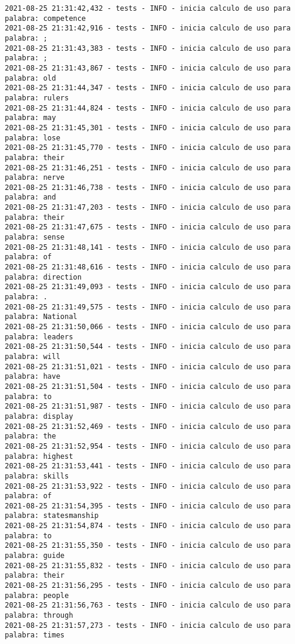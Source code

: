 \documentclass[11pt]{article}
\begin{document}
\begin{verbatim}
2021-08-25 21:31:42,432 - tests - INFO - inicia calculo de uso para palabra: competence
2021-08-25 21:31:42,916 - tests - INFO - inicia calculo de uso para palabra: ;
2021-08-25 21:31:43,383 - tests - INFO - inicia calculo de uso para palabra: ;
2021-08-25 21:31:43,867 - tests - INFO - inicia calculo de uso para palabra: old
2021-08-25 21:31:44,347 - tests - INFO - inicia calculo de uso para palabra: rulers
2021-08-25 21:31:44,824 - tests - INFO - inicia calculo de uso para palabra: may
2021-08-25 21:31:45,301 - tests - INFO - inicia calculo de uso para palabra: lose
2021-08-25 21:31:45,770 - tests - INFO - inicia calculo de uso para palabra: their
2021-08-25 21:31:46,251 - tests - INFO - inicia calculo de uso para palabra: nerve
2021-08-25 21:31:46,738 - tests - INFO - inicia calculo de uso para palabra: and
2021-08-25 21:31:47,203 - tests - INFO - inicia calculo de uso para palabra: their
2021-08-25 21:31:47,675 - tests - INFO - inicia calculo de uso para palabra: sense
2021-08-25 21:31:48,141 - tests - INFO - inicia calculo de uso para palabra: of
2021-08-25 21:31:48,616 - tests - INFO - inicia calculo de uso para palabra: direction
2021-08-25 21:31:49,093 - tests - INFO - inicia calculo de uso para palabra: .
2021-08-25 21:31:49,575 - tests - INFO - inicia calculo de uso para palabra: National
2021-08-25 21:31:50,066 - tests - INFO - inicia calculo de uso para palabra: leaders
2021-08-25 21:31:50,544 - tests - INFO - inicia calculo de uso para palabra: will
2021-08-25 21:31:51,021 - tests - INFO - inicia calculo de uso para palabra: have
2021-08-25 21:31:51,504 - tests - INFO - inicia calculo de uso para palabra: to
2021-08-25 21:31:51,987 - tests - INFO - inicia calculo de uso para palabra: display
2021-08-25 21:31:52,469 - tests - INFO - inicia calculo de uso para palabra: the
2021-08-25 21:31:52,954 - tests - INFO - inicia calculo de uso para palabra: highest
2021-08-25 21:31:53,441 - tests - INFO - inicia calculo de uso para palabra: skills
2021-08-25 21:31:53,922 - tests - INFO - inicia calculo de uso para palabra: of
2021-08-25 21:31:54,395 - tests - INFO - inicia calculo de uso para palabra: statesmanship
2021-08-25 21:31:54,874 - tests - INFO - inicia calculo de uso para palabra: to
2021-08-25 21:31:55,350 - tests - INFO - inicia calculo de uso para palabra: guide
2021-08-25 21:31:55,832 - tests - INFO - inicia calculo de uso para palabra: their
2021-08-25 21:31:56,295 - tests - INFO - inicia calculo de uso para palabra: people
2021-08-25 21:31:56,763 - tests - INFO - inicia calculo de uso para palabra: through
2021-08-25 21:31:57,273 - tests - INFO - inicia calculo de uso para palabra: times

\end{verbatim}
\end{document}

